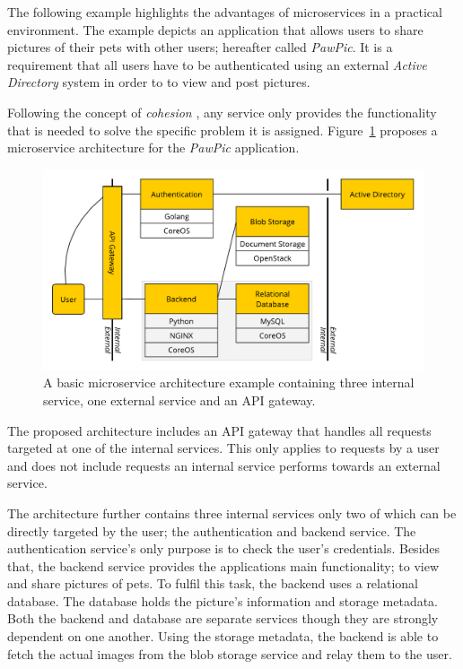 The following example highlights the advantages of microservices in a practical
environment. The example depicts an application that allows users to share
pictures of their pets with other users; hereafter called \textit{PawPic}.
It is a requirement that all users have to be authenticated using an external
\textit{Active Directory} system in order to to view and post pictures.

Following the concept of \textit{cohesion} \autocite[p.
2]{DragoniMicroservicesyesterdaytoday2016}, any service only provides the
functionality that is needed to solve the specific problem it is assigned.
Figure~\ref{fig:microservice_example} proposes a microservice architecture for
the \textit{PawPic} application.

\begin{figure}[H]
\begin{center}
  \includegraphics[scale=0.7]{images/figures/microservice_example.pdf}
\end{center}
\caption{A basic microservice architecture example containing three internal
service, one external service and an \acs{API} gateway.}
\label{fig:microservice_example}
\end{figure}

The proposed architecture includes an \ac{API} gateway that handles all requests
targeted at one of the internal services. This only applies to requests by a
user and does not include requests an internal service performs towards an
external service.

The architecture further contains three internal services only two of which can
be directly targeted by the user; the authentication and backend service. The
authentication service's only purpose is to check the user's credentials.
Besides that, the backend service provides the applications main functionality;
to view and share pictures of pets. To fulfil this task, the backend uses a
relational database. The database holds the picture's information and storage
metadata. Both the backend and database are separate services though they are
strongly dependent on one another. Using the storage metadata, the backend is
able to fetch the actual images from the blob storage service and relay them to
the user.

